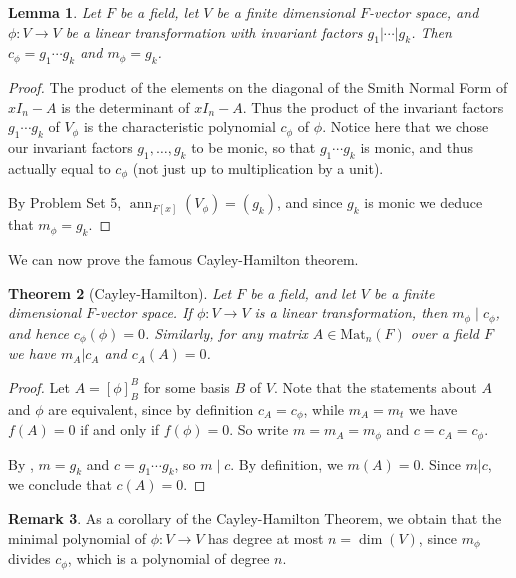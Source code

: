 \documentclass[12pt]{report}
\newtheorem{theorem}{Theorem}[chapter]
\newtheorem{lemma}[theorem]{Lemma}
\numberwithin{equation}{section}
\numberwithin{theorem}{chapter}
\theoremstyle{definition}
\newtheorem*{basic properties}{Basic Properties}
\newtheorem*{Important Remark}{Important Remark}
\newtheorem{remark}[theorem]{Remark}
\DeclareMathOperator{\ann}{ann}
\begin{document}
\begin{lemma}\label{cayley hamilton c = product of gs and m=largest g}
Let $F$ be a field, let $V$ be a finite dimensional $F$-vector space, and $\phi\!: V \to V$ be a linear transformation with invariant factors $g_1 | \cdots | g_k$. Then $c_\phi = g_1 \cdots g_k$ and $m_\phi = g_k$.
\end{lemma}



\begin{proof}
The product of the elements on the diagonal of the Smith Normal Form of $xI_n-A$ is the determinant of $xI_n-A$. Thus the product of the invariant factors $g_1 \cdots g_k$ of $V_\phi$ is the characteristic polynomial $c_\phi$ of $\phi$. Notice here that we chose our invariant factors $g_1, \ldots, g_k$ to be monic, so that $g_1 \cdots g_k$ is monic, and thus actually equal to $c_\phi$ (not just up to multiplication by a unit).

By Problem Set 5, $\ann_{F[x]}(V_\phi)=(g_k)$, and since $g_k$ is monic we deduce that $m_\phi=g_k$.
\end{proof}


We can now prove the famous Cayley-Hamilton theorem.


\begin{theorem}[Cayley-Hamilton]\label{cayley-hamilton}
	Let $F$ be a field, and let $V$ be a finite dimensional $F$-vector space. If $\phi: V \to V$ is a linear transformation, then $m_\phi \mid c_\phi$, and hence $c_\phi(\phi) = 0$. Similarly, for any matrix $A \in \mathrm{Mat}_n(F)$ over a field $F$ we have $m_A | c_A$ and $c_A(A) = 0$.
\end{theorem}


\begin{proof}
Let $A = [\phi]_B^B$ for some basis $B$ of $V$. Note that the statements about $A$ and $\phi$ are equivalent, since by definition $c_A = c_\phi$, while $m_A=m_t$ we have $f(A) = 0$ if and only if $f(\phi) = 0$. So write $m= m_A=m_\phi$ and $c=c_A=c_\phi$.

 
	By , $m = g_k$ and $c = g_1 \cdots g_k$, so $m \mid c$. By definition, we  $m(A) = 0$. Since $m|c$, we conclude that $c(A)=0$.
\end{proof}


\begin{remark}
	As a corollary of the Cayley-Hamilton Theorem, we obtain that the minimal polynomial of $\phi\!: V \to V$ has degree at most $n = \dim(V)$, since $m_\phi$ divides $c_\phi$, which is a polynomial of degree $n$. 
\end{remark}
\end{document}
